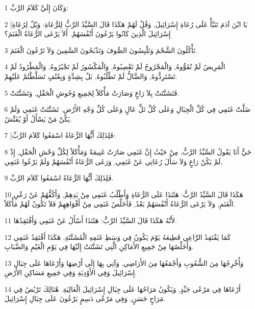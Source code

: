 \par 1 وَكَانَ إِلَيَّ كَلاَمُ الرَّبِّ:
\par 2 [يَا ابْنَ آدَمَ تَنَبَّأْ عَلَى رُعَاةِ إِسْرَائِيلَ, وَقُلْ لَهُمْ هَكَذَا قَالَ السَّيِّدُ الرَّبُّ لِلرُّعَاةِ: وَيْلٌ لِرُعَاةِ إِسْرَائِيلَ الَّذِينَ كَانُوا يَرْعُونَ أَنْفُسَهُمْ. أَلاَ يَرْعَى الرُّعَاةُ الْغَنَمَ؟
\par 3 تَأْكُلُونَ الشَّحْمَ وَتَلْبِسُونَ الصُّوفَ وَتَذْبَحُونَ السَّمِينَ وَلاَ تَرْعُونَ الْغَنَمَ.
\par 4 الْمَرِيضُ لَمْ تُقَوُّوهُ, وَالْمَجْرُوحُ لَمْ تَعْصِبُوهُ, وَالْمَكْسُورُ لَمْ تَجْبُرُوهُ, وَالْمَطْرُودُ لَمْ تَسْتَرِدُّوهُ, وَالضَّالُّ لَمْ تَطْلُبُوهُ, بَلْ بِشِدَّةٍ وَبِعُنْفٍ تَسَلَّطْتُمْ عَلَيْهِمْ.
\par 5 فَتَشَتَّتَتْ بِلاَ رَاعٍ وَصَارَتْ مَأْكَلاً لِجَمِيعِ وُحُوشِ الْحَقْلِ, وَتَشَتَّتَتْ.
\par 6 ضَلَّتْ غَنَمِي فِي كُلِّ الْجِبَالِ وَعَلَى كُلِّ تَلٍّ عَالٍ وَعَلَى كُلِّ وَجْهِ الأَرْضِ. تَشَتَّتَتْ غَنَمِي وَلَمْ يَكُنْ مَنْ يَسْأَلُ أَوْ يُفَتِّشُ.
\par 7 [فَلِذَلِكَ أَيُّهَا الرُّعَاةُ اسْمَعُوا كَلاَمَ الرَّبِّ:
\par 8 حَيٌّ أَنَا يَقُولُ السَّيِّدُ الرَّبُّ, مِنْ حَيْثُ إِنَّ غَنَمِي صَارَتْ غَنِيمَةً وَمَأْكَلاً لِكُلِّ وَحْشِ الْحَقْلِ, إِذْ لَمْ يَكُنْ رَاعٍ وَلاَ سَأَلَ رُعَاتِي عَنْ غَنَمِي, وَرَعَى الرُّعَاةُ أَنْفُسَهُمْ وَلَمْ يَرْعُوا غَنَمِي,
\par 9 فَلِذَلِكَ أَيُّهَا الرُّعَاةُ اسْمَعُوا كَلاَمَ الرَّبِّ.
\par 10 هَكَذَا قَالَ السَّيِّدُ الرَّبُّ: هَئَنَذَا عَلَى الرُّعَاةِ وَأَطْلُبُ غَنَمِي مِنْ يَدِهِمْ, وَأَكُفُّهُمْ عَنْ رَعْيِ الْغَنَمِ, وَلاَ يَرْعَى الرُّعَاةُ أَنْفُسَهُمْ بَعْدُ, فَأُخَلِّصُ غَنَمِي مِنْ أَفْوَاهِهِمْ فَلاَ تَكُونُ لَهُمْ مَأْكَلاً.
\par 11 لأَنَّهُ هَكَذَا قَالَ السَّيِّدُ الرَّبُّ: هَئَنَذَا أَسْأَلُ عَنْ غَنَمِي وَأَفْتَقِدُهَا.
\par 12 كَمَا يَفْتَقِدُ الرَّاعِي قَطِيعَهُ يَوْمَ يَكُونُ فِي وَسَطِ غَنَمِهِ الْمُشَتَّتَةِ, هَكَذَا أَفْتَقِدُ غَنَمِي وَأُخَلِّصُهَا مِنْ جَمِيعِ الأَمَاكِنِ الَّتِي تَشَتَّتَتْ إِلَيْهَا فِي يَوْمِ الْغَيْمِ وَالضَّبَابِ.
\par 13 وَأُخْرِجُهَا مِنَ الشُّعُوبِ وَأَجْمَعُهَا مِنَ الأَرَاضِي, وَآتِي بِهَا إِلَى أَرْضِهَا وَأَرْعَاهَا عَلَى جِبَالِ إِسْرَائِيلَ وَفِي الأَوْدِيَةِ وَفِي جَمِيعِ مَسَاكِنِ الأَرْضِ.
\par 14 أَرْعَاهَا فِي مَرْعًى جَيِّدٍ, وَيَكُونُ مَرَاحُهَا عَلَى جِبَالِ إِسْرَائِيلَ الْعَالِيَةِ. هُنَالِكَ تَرْبُضُ فِي مَرَاحٍ حَسَنٍ, وَفِي مَرْعًى دَسِمٍ يَرْعُونَ عَلَى جِبَالِ إِسْرَائِيلَ.
